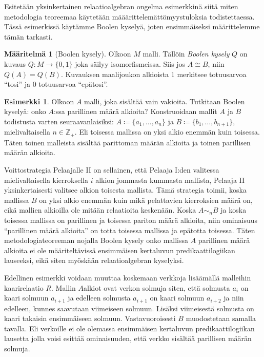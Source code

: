 \documentclass[finnish]{tktltiki2}
\theoremstyle{definition}
\newtheorem{maar}[lau]{Määritelmä}
\newtheorem{esim}[lau]{Esimerkki}
\theoremstyle{remark}
\begin{document}
Esitetään yksinkertainen relaatioalgebran ongelma esimerkkinä siitä miten metodologia teoreemaa käytetään määärittelemättömyystuloksia todistettaessa. Tässä esimerkissä käytämme Boolen kyselyä, joten ensimmäiseksi määrittelemme tämän tarkasti.

\begin{maar}[Boolen kysely]
Olkoon $M$ malli. Tällöin \textit{Boolen kysely} $Q$ on kuvaus $Q: M \to \{0, 1\}$ joka säilyy isomorfismeissa. Siis jos $A \cong B$, niin $Q(A) = Q(B)$. Kuvauksen maalijoukon alkioista $1$ merkitsee totuusarvoa ``tosi'' ja $0$ totuusarvoa ``epätosi''.
\end{maar}

\begin{esim}
Olkoon $A$ malli, joka sisältää vain vakioita. Tutkitaan Boolen kyselyä: onko $A$:ssa parillinen määrä alkioita? Konstruoidaan mallit $A$ ja $B$ todistusta varten seuraavanlaisiksi: $A \coloneqq \{a_1, \ldots, a_n\}$ ja $B \coloneqq \{b_1, \ldots, b_{n + 1}\}$, mielivaltaisella $n \in \mathbb{Z}_+$. Eli toisessa mallissa on yksi alkio enemmän kuin toisessa. Täten toinen malleista sisältää parittoman määrän alkioita ja toinen parillisen määrän alkioita.

Voittostrategia Pelaajalle II on sellainen, että Pelaaja I:den valitessa mielivaltaisella kierroksella $i$ alkion jommasta kummasta mallista, Pelaaja II yksinkertaisesti valitsee alkion toisesta mallista. Tämä strategia toimii, koska mallissa $B$ on yksi alkio enemmän kuin mikä pelattavien kierroksien määrä on, eikä mallien alkioilla ole mitään relaatioita keskenään. Koska $A \sim_n B$ ja koska toisessa mallissa on parillinen ja toisessa pariton määrä alkioita, niin ominaisuus ``parillinen määrä alkioita'' on totta toisessa mallissa ja epätotta toisessa. Täten metodologiateoreeman nojalla Boolen kysely onko mallissa $A$ parillinen määrä alkioita ei ole määriteltävissä ensimmäisen kertaluvun predikaattilogiikan lauseeksi, eikä siten myöskään relaatioalgebran kyselyksi.
\end{esim}

Edellinen esimerkki voidaan muuttaa koskemaan verkkoja lisäämällä malleihin kaarirelaatio $R$. Mallin $A$alkiot ovat verkon solmuja siten, että solmusta $a_i$ on kaari solmuun $a_{i + 1}$ ja edelleen solmusta $a_{i + 1}$ on kaari solmuun $a_{i + 2}$ ja niin edelleen, kunnes saavutaan viimeiseen solmuun. Lisäksi viimeisestä solmusta on kaari takaisin ensimmäiseen solmuun. Vastavuoroisesti $B$ muodostetaan samalla tavalla. Eli verkoille ei ole olemassa ensimmäisen kertaluvun predikaattilogiikan lausetta jolla voisi esittää ominaisuuden, että verkko sisältää parillisen määrän solmuja.
\end{document}
